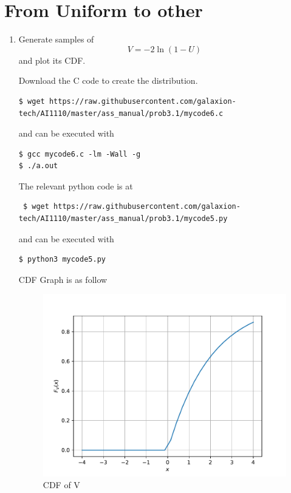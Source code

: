 \documentclass[journal,12pt,twocolumn]{IEEEtran}
\renewcommand\thesection{\arabic{section}}
\begin{document}
\section{From Uniform to other}
\begin{enumerate}[label=\thesection.\arabic*.,ref=\thesection.\theenumi]

\item Generate samples of
\begin{equation}
    V = -2 \ln (1-U)
\end{equation}
and plot its CDF.\\
\solution 

Download the C code to create the distribution.

\begin{lstlisting}
$ wget https://raw.githubusercontent.com/galaxion-tech/AI1110/master/ass_manual/prob3.1/mycode6.c
\end{lstlisting}
and can be executed with
\begin{lstlisting}
$ gcc mycode6.c -lm -Wall -g
$ ./a.out
\end{lstlisting}

The relevant python code is at

\begin{lstlisting}
 $ wget https://raw.githubusercontent.com/galaxion-tech/AI1110/master/ass_manual/prob3.1/mycode5.py
\end{lstlisting}
and can be executed with
\begin{lstlisting}
$ python3 mycode5.py
\end{lstlisting}

CDF Graph is as follow 
\begin{figure}[H]
    \includegraphics[scale=0.6]{./figs/other_cdf}
    \caption{CDF of V}
\end{figure}


\end{enumerate}
\end{document}
